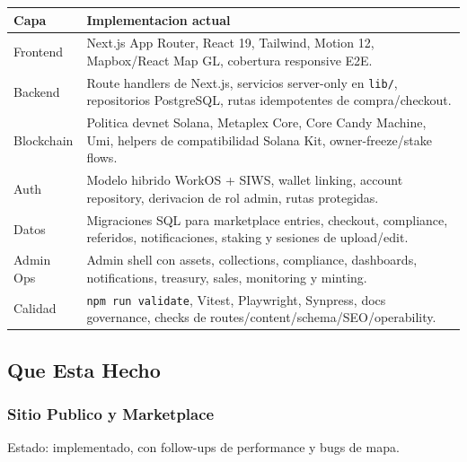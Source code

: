 \documentclass[
  10pt,
  letterpaper,
]{article}
\newcounter{none} %
\let\oldtexttt\texttt
\renewcommand{\texttt}[1]{\oldtexttt{\small #1}}
\begin{document}
{\def\LTcaptype{none} %
\begin{longtable}[]{@{}
  >{\raggedright\arraybackslash}p{}
  >{\raggedright\arraybackslash}p{}@{}}
\toprule\noalign{}
\begin{minipage}[b]{\linewidth}\raggedright
Capa
\end{minipage} & \begin{minipage}[b]{\linewidth}\raggedright
Implementacion actual
\end{minipage} \\
\midrule\noalign{}
\endhead
\bottomrule\noalign{}
\endlastfoot
Frontend & Next.js App Router, React 19, Tailwind, Motion 12,
Mapbox/React Map GL, cobertura responsive E2E. \\
Backend & Route handlers de Next.js, servicios server-only en
\texttt{lib/}, repositorios PostgreSQL, rutas idempotentes de
compra/checkout. \\
Blockchain & Politica devnet Solana, Metaplex Core, Core Candy Machine,
Umi, helpers de compatibilidad Solana Kit, owner-freeze/stake flows. \\
Auth & Modelo hibrido WorkOS + SIWS, wallet linking, account repository,
derivacion de rol admin, rutas protegidas. \\
Datos & Migraciones SQL para marketplace entries, checkout, compliance,
referidos, notificaciones, staking y sesiones de upload/edit. \\
Admin Ops & Admin shell con assets, collections, compliance, dashboards,
notifications, treasury, sales, monitoring y minting. \\
Calidad & \texttt{npm\ run\ validate}, Vitest, Playwright, Synpress,
docs governance, checks de routes/content/schema/SEO/operability. \\
\end{longtable}
}

\subsection{Que Esta Hecho}\label{que-esta-hecho}

\subsubsection{Sitio Publico y
Marketplace}\label{sitio-publico-y-marketplace}

Estado: implementado, con follow-ups de performance y bugs de mapa.
\end{document}

